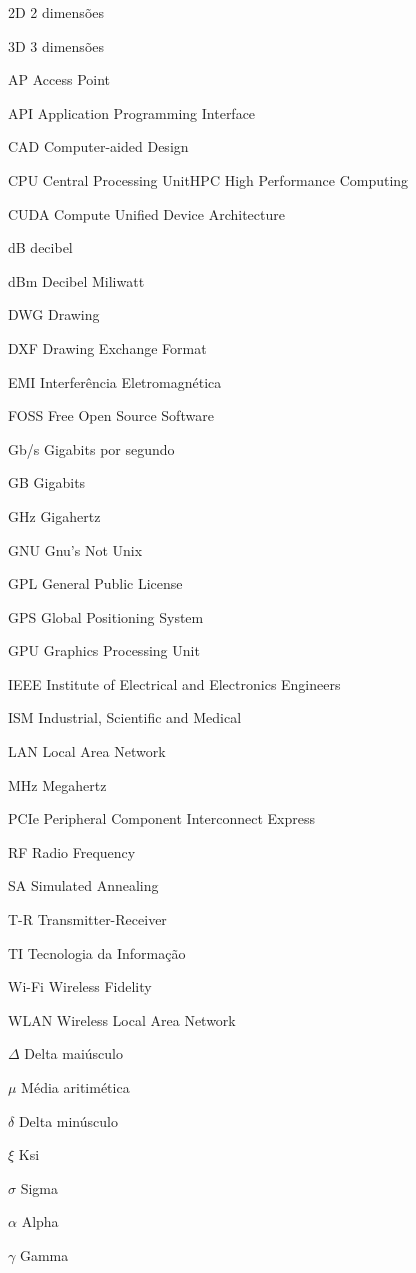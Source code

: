 \documentclass[
	12pt,				%
	twoside,			%
	a4paper,			%
	english,			%
	french,				%
	spanish,			%
	brazil				%
	]{abntex2}
\begin{document}
\begin{siglas}
  \item[2D] 2 dimensões
  \item[3D] 3 dimensões
  \item[AP] Access Point
  \item[API] Application Programming Interface
  \item[CAD] Computer-aided Design
  \item[CPU] Central Processing UnitHPC High Performance Computing
  \item[CUDA] Compute Unified Device Architecture
  \item[dB] decibel
  \item[dBm] Decibel Miliwatt
  \item[DWG] Drawing
  \item[DXF] Drawing Exchange Format
  \item[EMI] Interferência Eletromagnética
  \item[FOSS] Free Open Source Software
  \item[Gb/s] Gigabits por segundo
  \item[GB] Gigabits
  \item[GHz] Gigahertz
  \item[GNU] Gnu's Not Unix
  \item[GPL] General Public License
  \item[GPS] Global Positioning System
  \item[GPU] Graphics Processing Unit
  \item[IEEE] Institute of Electrical and Electronics Engineers
  \item[ISM] Industrial, Scientific and Medical
  \item[LAN] Local Area Network
  \item[MHz] Megahertz
  \item[PCIe] Peripheral Component Interconnect Express
  \item[RF] Radio Frequency
  \item[SA] Simulated Annealing
  \item[T-R] Transmitter-Receiver
  \item[TI] Tecnologia da Informação
  \item[Wi-Fi] Wireless Fidelity
  \item[WLAN] Wireless Local Area Network
\end{siglas}

\begin{simbolos}
  \item[$ \Delta $] Delta maiúsculo
  \item[$ \mu $] Média aritimética
  \item[$ \delta $] Delta minúsculo
  \item[$ \xi $] Ksi
  \item[$ \sigma $] Sigma
  \item[$ \alpha $] Alpha
  \item[$ \gamma $] Gamma
\end{simbolos}
\tableofcontents*
\cleardoublepage
\end{document}
